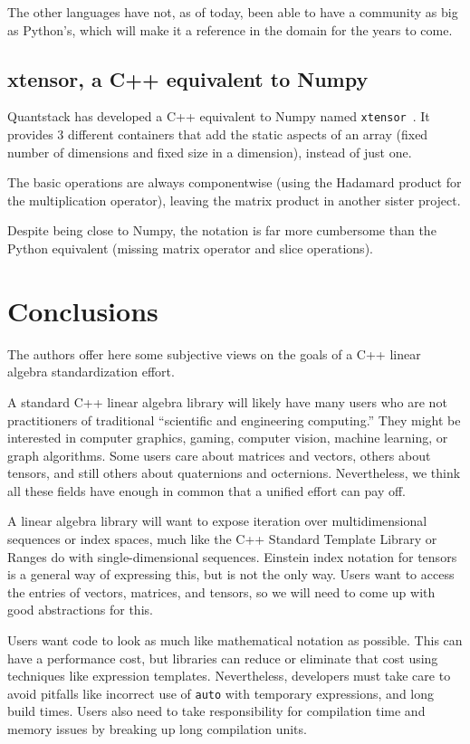  The other languages have not, as of today, been able to have
  a community as big as Python's, which will make it a reference in the
  domain for the years to come.

\subsection{xtensor, a C++ equivalent to Numpy}
\label{S:Python:xtensor}

Quantstack has developed a C++ equivalent to Numpy named 
 \texttt{xtensor}~\cite{xtensor}. It provides 3 different containers 
 that add the static aspects of an array (fixed number of dimensions
 and fixed size in a dimension), instead of just one.

The basic operations are always componentwise (using the Hadamard
 product for the multiplication operator), leaving the matrix product in 
 another sister project.

Despite being close to Numpy, the notation is far more cumbersome than 
 the Python equivalent (missing matrix operator and slice operations).


\section{Conclusions}
\label{S:conclusions}

The authors offer here some subjective views on the goals of a C++
linear algebra standardization effort.

A standard C++ linear algebra library will likely have many users who
are not practitioners of traditional ``scientific and engineering
computing.''  They might be interested in computer graphics, gaming,
computer vision, machine learning, or graph algorithms.  Some users
care about matrices and vectors, others about tensors, and still
others about quaternions and octernions.  Nevertheless, we think all
these fields have enough in common that a unified effort can pay off.

A linear algebra library will want to expose iteration over
multidimensional sequences or index spaces, much like the C++ Standard
Template Library or Ranges do with single-dimensional sequences.
Einstein index notation for tensors is a general way of expressing
this, but is not the only way.  Users want to access the entries of
vectors, matrices, and tensors, so we will need to come up with good
abstractions for this.

Users want code to look as much like mathematical notation as
possible.  This can have a performance cost, but libraries can reduce
or eliminate that cost using techniques like expression templates.
Nevertheless, developers must take care to avoid pitfalls like
incorrect use of \texttt{auto} with temporary expressions, and long
build times.  Users also need to take responsibility for compilation
time and memory issues by breaking up long compilation units.

